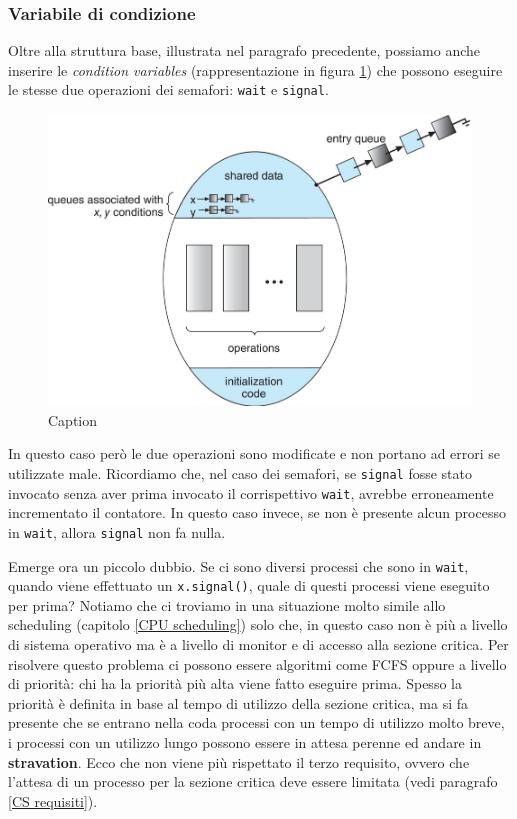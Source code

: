 \subsubsection{Variabile di condizione}
Oltre alla struttura base, illustrata nel paragrafo precedente, possiamo anche inserire le \textit{condition variables}  (rappresentazione in figura \ref{fig:condition_variable}) che possono eseguire le stesse due operazioni dei semafori: \texttt{wait} e \texttt{signal}.
\begin{figure}[!h]
    \centering
    \includegraphics[width = .65\textwidth]{../res/imgs/synchronization/condition_variable.png}
    \caption{Caption}
    \label{fig:condition_variable}
\end{figure}
In questo caso però le due operazioni sono modificate e non portano ad errori se utilizzate male. Ricordiamo che, nel caso dei semafori, se \texttt{signal} fosse stato invocato senza aver prima invocato il corrispettivo \texttt{wait}, avrebbe erroneamente incrementato il contatore. In questo caso invece, se non è presente alcun processo in \texttt{wait}, allora \texttt{signal} non fa nulla.

Emerge ora un piccolo dubbio. Se ci sono diversi processi che sono in \texttt{wait}, quando viene effettuato un \texttt{x.signal()}, quale di questi processi viene eseguito per prima? Notiamo che ci troviamo in una situazione molto simile allo scheduling (capitolo \ref{CPU scheduling}) solo che, in questo caso non è più a livello di sistema operativo ma è a livello di monitor e di accesso alla sezione critica. Per risolvere questo problema ci possono essere algoritmi come FCFS oppure a livello di priorità: chi ha la priorità più alta viene fatto eseguire prima. Spesso la priorità è definita in base al tempo di utilizzo della sezione critica, ma si fa presente che se entrano nella coda processi con un tempo di utilizzo molto breve, i processi con un utilizzo lungo possono essere in attesa perenne ed andare in \textbf{stravation}. Ecco che non viene più rispettato il terzo requisito, ovvero che l'attesa di un processo per la sezione critica deve essere limitata (vedi paragrafo \ref{CS requisiti}).
% 
